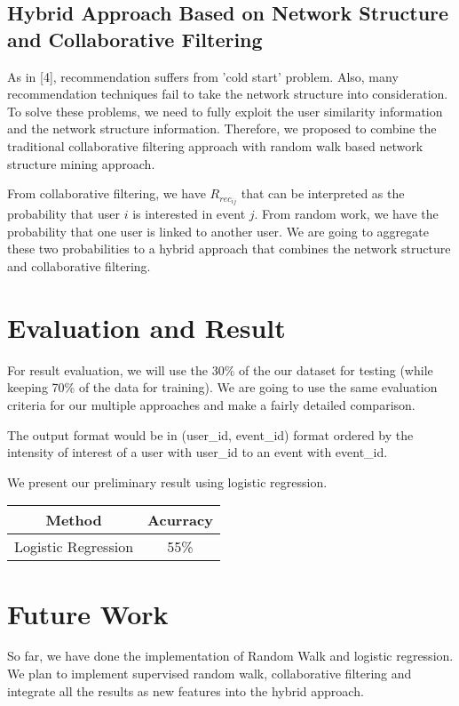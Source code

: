 \documentclass{article}
\begin{document}
\subsection{Hybrid Approach Based on Network Structure and Collaborative Filtering}
As in [4], recommendation suffers from 'cold start' problem. Also, many recommendation techniques fail to take the network structure into consideration. To solve these problems, we need to fully exploit the user similarity information and the network structure information. Therefore, we proposed to combine the traditional collaborative filtering approach with random walk based network structure mining approach. 

From collaborative filtering, we have $R_{rec_{ij}}$ that can be interpreted as the probability that user $i$ is interested in event $j$. From random work, we have the probability that one user is linked to another user. We are going to aggregate these two probabilities to a hybrid approach that combines the network structure and collaborative filtering.


\section{Evaluation and Result}
For result evaluation, we will use the 30\% of the our dataset for testing (while keeping 70\% of the data for training). We are going to use the same evaluation criteria for our multiple approaches and make a fairly detailed comparison.

The output format would be in (user\_id, event\_id) format ordered by the intensity of interest of a user with user\_id to an event with event\_id.


We present our preliminary result using logistic regression.

\begin{center}

\begin{tabular}{|c|c|}
\hline
Method&Acurracy\\ \hline
Logistic Regression&55\% \\ \hline
\end{tabular}
\end{center}

\section{Future Work}
So far, we have done the implementation of Random Walk and logistic regression. We plan to implement supervised random walk, collaborative filtering and integrate all the results as new features into the hybrid approach.
\end{document}
